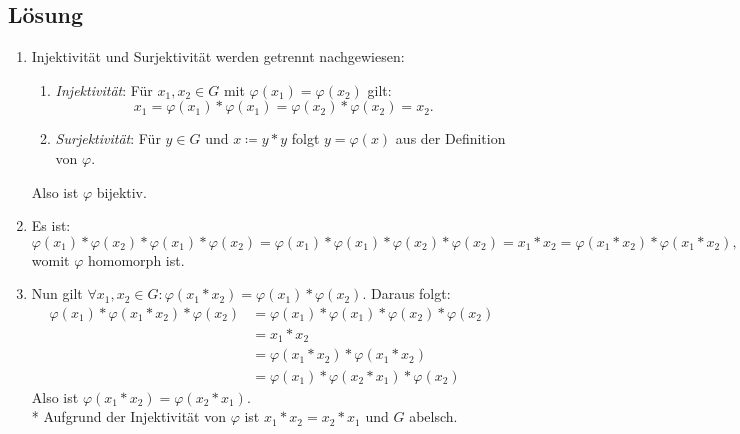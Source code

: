 \subsection{Lösung}
\begin{enumerate}
	\item Injektivität und Surjektivität werden getrennt nachgewiesen:
	\begin{enumerate}
	 	\item \emph{Injektivität}: Für \( x_1, x_2 \in G \) mit \( \varphi(x_1) = \varphi(x_2) \) gilt:
	 	\begin{equation*}
	 	 	x_1 = \varphi(x_1)*\varphi(x_1) = \varphi(x_2) * \varphi(x_2) = x_2\text{.}
	 	 \end{equation*} 
	 	 \item \emph{Surjektivität}: Für \( y \in G \) und \( x \coloneqq y*y \) folgt \( y = \varphi(x) \) aus der Definition von \( \varphi \).
	 \end{enumerate} 
	 Also ist \( \varphi \) bijektiv.

	 \item Es ist:
	 \begin{equation*}
	 	\varphi(x_1) * \varphi(x_2) * \varphi(x_1) * \varphi(x_2) = \varphi(x_1) * \varphi(x_1) * \varphi(x_2) * \varphi(x_2) = x_1 * x_2 = \varphi(x_1 * x_2) * \varphi(x_1 * x_2)\text{,}
	 \end{equation*}
	 womit \( \varphi \) homomorph ist.

	 \item Nun gilt \( \forall x_1, x_2 \in G : \varphi(x_1 * x_2) = \varphi(x_1) * \varphi(x_2) \). Daraus folgt:
	 \begin{align*}
	 	\varphi(x_1) * \varphi(x_1 * x_2) * \varphi(x_2) &= \varphi(x_1) * \varphi(x_1) * \varphi(x_2) * \varphi(x_2) \\
	 	 &= x_1 * x_2 \\
	 	 &= \varphi(x_1 * x_2) * \varphi(x_1 * x_2) \\
	 	 &= \varphi(x_1) * \varphi(x_2 * x_1) * \varphi(x_2)
	 \end{align*}
	 Also ist \( \varphi(x_1 * x_2) = \varphi(x_2 * x_1) \). \\* Aufgrund der Injektivität von \( \varphi \) ist \( x_1 * x_2 = x_2 * x_1 \) und \( G \) abelsch.
\end{enumerate}

\newpage

